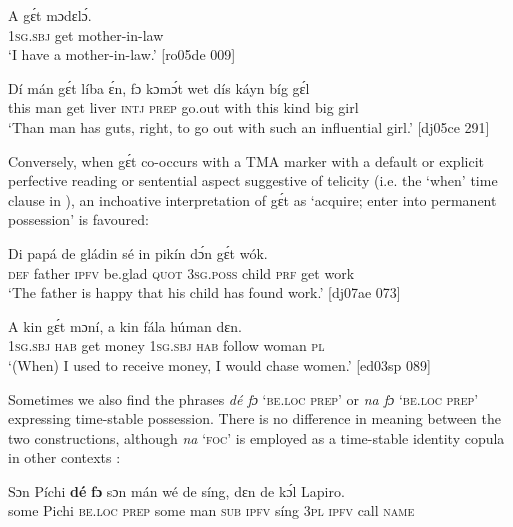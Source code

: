 \ea%
    \label{ex:key:817}
    \gll A    gɛ́t  mɔdɛlɔ́.\\
\textsc{1sg.sbj}  get  mother-in-law\\

\glt ‘I have a mother-in-law.’ [ro05de 009]
\z


\ea%
    \label{ex:key:818}
    \gll Dí  mán    gɛ́t  líba    ɛ́n,  fɔ  kɔmɔ́t  wet    dís  káyn  bíg  gɛ́l\\
this  man    get  liver  \textsc{intj}  \textsc{prep}  go.out  with    this   kind    big  girl\\

\glt ‘Than man has guts, right, to go out with such an influential girl.’ [dj05ce 291]
\z

Conversely, when gɛ́t co-occurs with a TMA marker with a default or explicit perfective reading  or sentential aspect suggestive of telicity (i.e. the ‘when’ time clause in ), an inchoative interpretation of gɛ́t as ‘acquire; enter into permanent possession’ is favoured: 


\ea%
    \label{ex:key:819}
    \gll Di  papá  de  gládin  sé    in    pikín  dɔ́n  gɛ́t  wók.\\
\textsc{def}  father  \textsc{ipfv}  be.glad  \textsc{quot}    \textsc{3sg.poss}  child  \textsc{prf}  get  work\\

\glt ‘The father is happy that his child has found work.’ [dj07ae 073]
\z


\ea%
    \label{ex:key:820}
    \gll A    kin  gɛ́t  mɔní,  a    kin  fála    húman  dɛn.\\
\textsc{1sg.sbj}  \textsc{hab}  get  money  \textsc{1sg.sbj}  \textsc{hab}  follow  woman  \textsc{pl}\\

\glt ‘(When) I used to receive money, I would chase women.’ [ed03sp 089]
\z

Sometimes we also find the phrases \textit{dé fɔ} ‘\textsc{be.loc} \textsc{prep}’ or \textit{na fɔ} ‘\textsc{be.loc} \textsc{prep}’ expressing time-stable possession. There is no difference in meaning between the two constructions, although \textit{na} ‘\textsc{foc}’ is employed as a time-stable identity copula in other contexts : 


\ea%
    \label{ex:key:821}
    \gll Sɔn    Píchi  \textbf{dé}    \textbf{fɔ}  sɔn    mán    wé  de  síng, 
dɛn  de  kɔ́l  Lapiro.\\
some  Pichi  \textsc{be.loc}  \textsc{prep}  some  man    \textsc{sub}  \textsc{ipfv}  síng
\textsc{3pl}  \textsc{ipfv}  call  \textsc{name}\\

